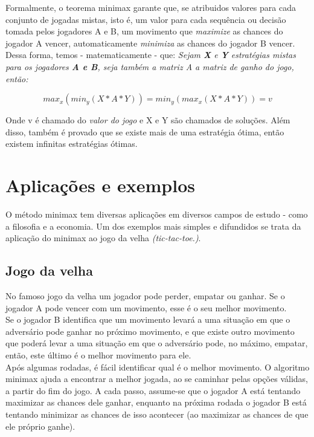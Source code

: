 \documentclass[]{article}
\begin{document}
	Formalmente, o teorema minimax garante que, se atribuidos valores para cada conjunto de jogadas mistas, isto é, um valor para cada sequência ou decisão tomada pelos jogadores A e B, um movimento que \emph{maximize} as chances do jogador A vencer, automaticamente \emph{minimiza} as chances do jogador B vencer. \\
	
	Dessa forma, temos - matematicamente - que:
	\textit{Sejam \textbf{X} e \textbf{Y} estratégias mistas para os jogadores \textbf{A e B}, seja também a matriz A a matriz de ganho do jogo, então:}
	
	$$max_x (min_y(X*A*Y)) = min_y (max_x(X*A*Y)) = v $$
	
	Onde v é chamado do \textit{valor do jogo} e X e Y são chamados de soluções. Além disso, também é provado que se existe mais de uma estratégia ótima, então existem infinitas estratégias ótimas. \cite{wolfram}
	
	
	
	\section{Aplicações e exemplos}
	
	O método minimax tem diversas aplicações em diversos campos de estudo - como a filosofia e a economia. Um dos exemplos mais simples e difundidos se trata da aplicação do minimax ao jogo da velha \emph{(tic-tac-toe.)}.
	\subsection{Jogo da velha}
	No famoso jogo da velha um jogador pode perder, empatar ou ganhar. Se o jogador A pode vencer com um movimento, esse é o seu melhor movimento.\\
	
	Se o jogador B identifica que um movimento levará a uma situação em que o adversário pode ganhar no próximo movimento, e que existe outro movimento que poderá levar a uma situação em que o adversário pode, no máximo, empatar, então, este último é o melhor movimento para ele.\\
	
    Após algumas rodadas, é fácil identificar qual é o melhor movimento. O algoritmo minimax ajuda a encontrar a melhor jogada, ao se caminhar pelas opções válidas, a partir do fim do jogo. A cada passo, assume-se que o jogador A está tentando maximizar as chances dele ganhar, enquanto na próxima rodada o jogador B está tentando minimizar as chances de isso acontecer (ao maximizar as chances de que ele próprio ganhe). \\
\end{document}
